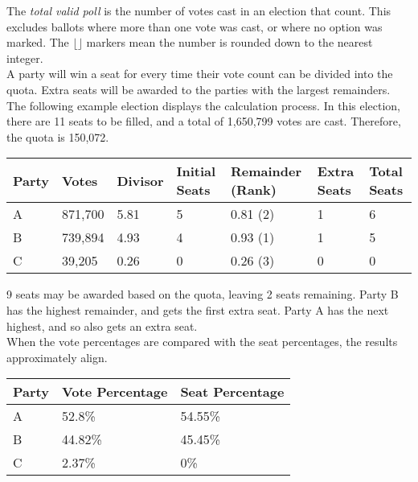 \documentclass{article}
\begin{document}
    The \textit{total valid poll} is the number of votes cast in an election that count. This excludes ballots where more than one vote was cast, or where no option was marked. The $\lfloor \rfloor$ markers mean the number is rounded down to the nearest integer.\\

    A party will win a seat for every time their vote count can be divided into the quota. Extra seats will be awarded to the parties with the largest remainders. The following example election displays the calculation process. In this election, there are 11 seats to be filled, and a total of 1,650,799 votes are cast. Therefore, the quota is 150,072.\\

    \begin{adjustbox}{center}
    \begin{tabular}{ |l|l|l|l|l|l|l| }
        \hline
        Party & Votes & Divisor & Initial Seats & Remainder (Rank) & Extra Seats & Total Seats \\
        \hline
        A & 871,700 & 5.81 & 5 & 0.81 (2) & 1 & 6 \\
        \hline
        B & 739,894 & 4.93 & 4 & 0.93 (1) & 1 & 5 \\
        \hline
        C & 39,205 & 0.26 & 0 & 0.26 (3) & 0 & 0 \\
        \hline
    \end{tabular}
    \end{adjustbox}
    
    9 seats may be awarded based on the quota, leaving 2 seats remaining. Party B has the highest remainder, and gets the first extra seat. Party A has the next highest, and so also gets an extra seat. \\

    When the vote percentages are compared with the seat percentages, the results approximately align.\\
    
    \begin{adjustbox}{center}
    \begin{tabular}{ |l|l|l| }
        \hline
        Party & Vote Percentage & Seat Percentage \\
        \hline
        A & 52.8\% & 54.55\% \\
        \hline
        B & 44.82\% & 45.45\% \\
        \hline
        C & 2.37\% & 0\% \\
        \hline
    \end{tabular}
    \end{adjustbox}
\end{document}
